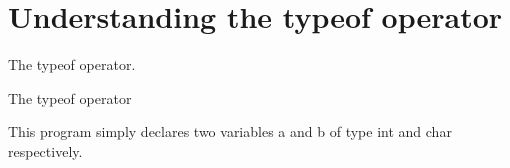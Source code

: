 \chapter{Understanding the {\ttfamily typeof} operator }
\hypertarget{index}{}\label{index}
The {\ttfamily typeof} operator.

The {\ttfamily typeof} operator  

This program simply declares two variables {\ttfamily a} and {\ttfamily b} of type {\ttfamily int} and {\ttfamily char} respectively. 
